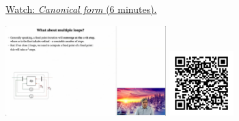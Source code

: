 
\begin{minipage}{10cm}
    \href{https://act4e-spring21.netlify.app/videos/spring2021-functorial-comp-b:solving-queries:multi-loop.html}{Watch: \emph{Canonical form} (6 minutes).}
        
    \href{https://act4e-spring21.netlify.app/videos/spring2021-functorial-comp-b:solving-queries:multi-loop.html}{\includegraphics[height=3.5cm]{spring2021-functorial-comp-b:solving-queries:multi-loop/thumbnails.jpg}}
    \href{https://act4e-spring21.netlify.app/videos/spring2021-functorial-comp-b:solving-queries:multi-loop.html}{\includegraphics[height=2.5cm]{spring2021-functorial-comp-b:solving-queries:multi-loop/qrcode.png}}
\end{minipage}
